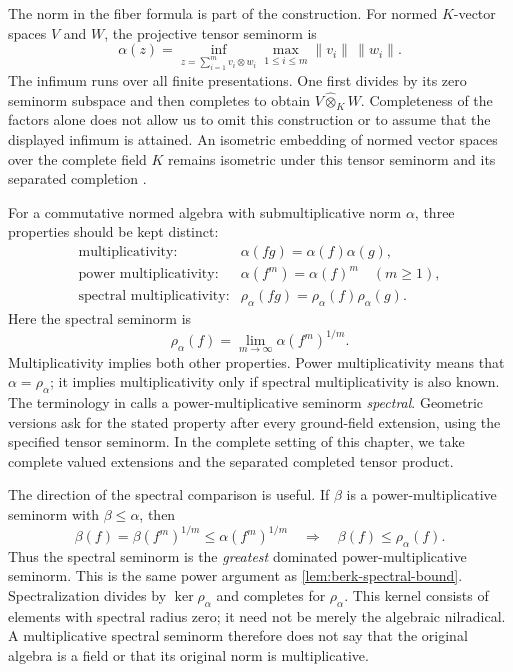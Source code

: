 The norm in the fiber formula is part of the construction. For normed
$K$-vector spaces $V$ and $W$, the projective tensor seminorm is
\[
 \alpha(z)=\inf_{z=\sum_{i=1}^m v_i\otimes w_i}
                 \max_{1\leq i\leq m}\|v_i\|\,\|w_i\|.
\]
The infimum runs over all finite presentations. One first divides by
its zero seminorm subspace and then completes to obtain
$V\widehat\otimes_K W$. Completeness of the factors alone does not
allow us to omit this construction or to assume that the displayed
infimum is attained. An isometric embedding of normed vector spaces
over the complete field $K$ remains isometric under this tensor
seminorm and its separated completion
\cite[Lemma~3.1, pp.~277--278]{Poi13Angelic}.

For a commutative normed algebra with submultiplicative norm $\alpha$,
three properties should be kept distinct:
\[
\begin{array}{ll}
\text{multiplicativity:}&\alpha(fg)=\alpha(f)\alpha(g),\\
\text{power multiplicativity:}&\alpha(f^m)=\alpha(f)^m\quad(m\geq1),\\
\text{spectral multiplicativity:}&
 \rho_\alpha(fg)=\rho_\alpha(f)\rho_\alpha(g).
\end{array}
\]
Here the spectral seminorm is
\[
             \rho_\alpha(f)=\lim_{m\to\infty}\alpha(f^m)^{1/m}.
\]
Multiplicativity implies both other properties. Power multiplicativity
means that $\alpha=\rho_\alpha$; it implies multiplicativity only if
spectral multiplicativity is also known. The terminology in
\cite[\S\S1.1--1.2]{TZ26GeometricNorms} calls a power-multiplicative
seminorm \emph{spectral}. Geometric versions ask for the stated
property after every ground-field extension, using the specified tensor
seminorm. In the complete setting of this chapter, we take complete
valued extensions and the separated completed tensor product.

The direction of the spectral comparison is useful. If $\beta$ is a
power-multiplicative seminorm with $\beta\leq\alpha$, then
\[
 \beta(f)=\beta(f^m)^{1/m}\leq\alpha(f^m)^{1/m}
 \quad\Longrightarrow\quad \beta(f)\leq\rho_\alpha(f).
\]
Thus the spectral seminorm is the \emph{greatest} dominated
power-multiplicative seminorm. This is the same power argument as
\cref{lem:berk-spectral-bound}. Spectralization divides by
$\ker\rho_\alpha$ and completes for $\rho_\alpha$. This kernel consists
of elements with spectral radius zero; it need not be merely the
algebraic nilradical. A multiplicative spectral seminorm therefore does
not say that the original algebra is a field or that its original norm
is multiplicative.

